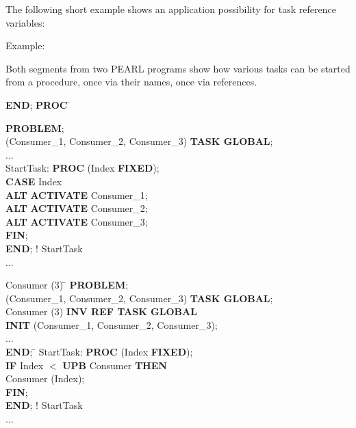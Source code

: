 The following short example shows an application possibility for task
reference variables:

Example:

Both segments from two PEARL programs show how various tasks can be
started from a procedure, once via their names, once via references.

\begin{tabbing}
 \= {\bf END}; \= {\bf PROC} \= \kill

{\bf PROBLEM}; \> \> \\
 (Consumer\_1, Consumer\_2, Consumer\_3) {\bf TASK GLOBAL}; \> \> \> \\
\x ... \> \> \> \\
\x StartTask: \> \> {\bf PROC} \> (Index {\bf FIXED});\\
       \> \> {\bf CASE} \> Index \\
       \> \> {\bf ALT}  \> {\bf ACTIVATE} Consumer\_1;\\
       \> \> {\bf ALT}  \> {\bf ACTIVATE} Consumer\_2; \\
       \> \> {\bf ALT}  \> {\bf ACTIVATE} Consumer\_3; \\
       \> \> {\bf FIN}; \> \\
\x \> {\bf END}; \> ! StartTask \> \\
\x ... \> \> \>
\end{tabbing}

\begin{tabbing}
 Consumer (3) \= \kill
{\bf PROBLEM}; \>  \\
 (Consumer\_1, Consumer\_2, Consumer\_3) {\bf TASK GLOBAL}; \> \\
 Consumer (3) \> {\bf INV REF TASK GLOBAL} \\
     \> {\bf INIT} (Consumer\_1, Consumer\_2, Consumer\_3);\\
\x ... \> \\
 \= {\bf END}; \= \kill
\x StartTask: \> \> {\bf PROC} (Index {\bf FIXED});\\
       \> \> {\bf IF} Index $<$ {\bf UPB} Consumer {\bf THEN}\\
       \> \>  Consumer (Index);\\
       \> \> {\bf FIN};\\
\x \> {\bf END}; \> ! StartTask\\

\x ... \> \>
\end{tabbing}

